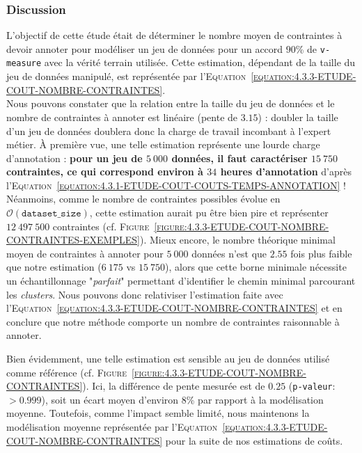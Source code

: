 		\subsubsection{Discussion}
		
			L'objectif de cette étude était de déterminer le nombre moyen de contraintes à devoir annoter pour modéliser un jeu de données pour un accord $90$\% de \texttt{v-measure} avec la vérité terrain utilisée.
			Cette estimation, dépendant de la taille du jeu de données manipulé, est représentée par l'\textsc{Equation~\ref{equation:4.3.3-ETUDE-COUT-NOMBRE-CONTRAINTES}}.
			\\
			
			Nous pouvons constater que la relation entre la taille du jeu de données et le nombre de contraintes à annoter est linéaire (pente de $3.15$) : doubler la taille d'un jeu de données doublera donc la charge de travail incombant à l'expert métier.
			À première vue, une telle estimation représente une lourde charge d'annotation : \textbf{pour un jeu de $5~000$ données, il faut caractériser $15~750$ contraintes, ce qui correspond environ à $34$ heures d'annotation} d'après l'\textsc{Equation~\ref{equation:4.3.1-ETUDE-COUT-COUTS-TEMPS-ANNOTATION}} !
			Néanmoins, comme le nombre de contraintes possibles évolue en $ \mathcal{O}(\texttt{dataset\_size}) $, cette estimation aurait pu être bien pire et représenter $12~497~500$ contraintes (cf. \textsc{Figure~\ref{figure:4.3.3-ETUDE-COUT-NOMBRE-CONTRAINTES-EXEMPLES}}).
			Mieux encore, le nombre théorique minimal moyen de contraintes à annoter pour $5~000$ données n'est que $2.55$ fois plus faible que notre estimation ($6~175$ vs $15~750$), alors que cette borne minimale nécessite un échantillonnage "\textit{parfait}" permettant d'identifier le chemin minimal parcourant les \textit{clusters}.
			Nous pouvons donc relativiser l'estimation faite avec l'\textsc{Equation~\ref{equation:4.3.3-ETUDE-COUT-NOMBRE-CONTRAINTES}} et en conclure que notre méthode comporte un nombre de contraintes raisonnable à annoter.
			
			Bien évidemment, une telle estimation est sensible au jeu de données utilisé comme référence (cf. \textsc{Figure~\ref{figure:4.3.3-ETUDE-COUT-NOMBRE-CONTRAINTES}}).
			Ici, la différence de pente mesurée est de $0.25$ (\texttt{p-valeur}: $> 0.999$), soit un écart moyen d'environ $8$\% par rapport à la modélisation moyenne.
			Toutefois, comme l'impact semble limité, nous maintenons la modélisation moyenne représentée par l'\textsc{Equation~\ref{equation:4.3.3-ETUDE-COUT-NOMBRE-CONTRAINTES}} pour la suite de nos estimations de coûts.
		
